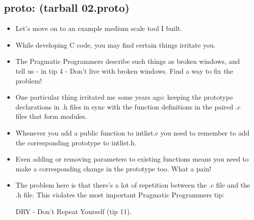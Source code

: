 \documentclass[aspectratio=169]{beamer}
\newcommand{\pitem}{\pause \item}
\begin{document}
\subsection{proto: (tarball 02.proto)}

\begin{frame}[fragile]
    \begin{itemize}
      \item
      Let's move on to an example medium scale tool I built.

    \item
      While developing C code, you may find certain things
      irritate you.

    \item
      The Pragmatic Programmers describe such things as \alert{broken windows},
      and tell us - in tip 4 - \alert{Don't live with broken windows}.
      Find a way to fix the problem!
  
    \pitem
      One particular thing irritated me some years ago:
      keeping the \alert{prototype declarations} in
      .h files in sync with the \alert{function definitions}
      in the paired .c files that form modules.

    \pitem
      Whenever you \alert{add a public function} to \alert{intlist.c}
      you need to remember to add the corresponding prototype to
      \alert{intlist.h}.

    \pitem
      Even \alert{adding or removing parameters} to existing functions
      means you need to make a corresponding change
      in the prototype too.
      \pause
      What a pain!

    \pitem
      The problem here is that there's a lot of repetition between
      the .c file and the .h file.
      This violates the most important Pragmatic Programmers tip:
      
      \alert{DRY - Don't Repeat Yourself} (tip 11).

    \end{itemize}
\end{frame}
\end{document}
